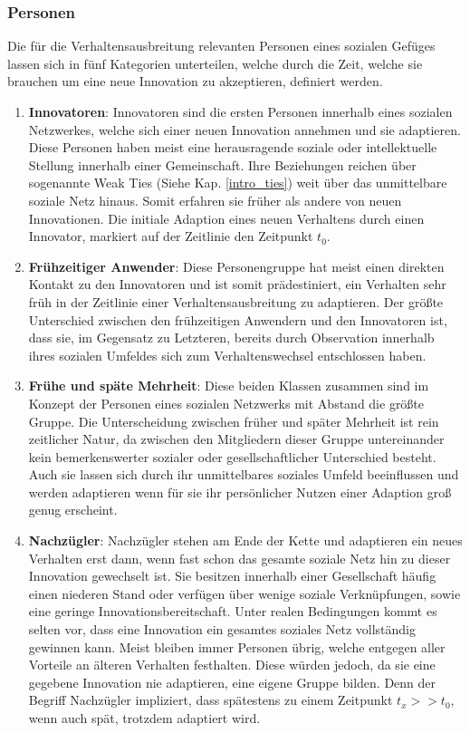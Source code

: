 \documentclass[12pt]{article}
\begin{document}
\subsubsection{Personen}
Die für die Verhaltensausbreitung relevanten Personen eines sozialen Gefüges lassen sich in fünf Kategorien unterteilen, welche durch die Zeit, welche sie brauchen um eine neue Innovation zu akzeptieren, definiert werden. \cite{Rogers03}
\begin{enumerate}
\item \textbf{Innovatoren}: Innovatoren sind die ersten Personen innerhalb eines sozialen Netzwerkes, welche sich einer neuen Innovation annehmen und sie adaptieren. Diese Personen haben meist eine herausragende soziale oder intellektuelle Stellung innerhalb einer Gemeinschaft. Ihre Beziehungen reichen über sogenannte Weak Ties (Siehe Kap. \ref{intro_ties}) weit über das unmittelbare soziale Netz hinaus. Somit erfahren sie früher als andere von neuen Innovationen. Die initiale Adaption eines neuen Verhaltens durch einen Innovator, markiert auf der Zeitlinie den Zeitpunkt $t_0$.
\item \textbf{Frühzeitiger Anwender}: Diese Personengruppe hat meist einen direkten Kontakt zu den Innovatoren und ist somit prädestiniert, ein Verhalten sehr früh in der Zeitlinie einer Verhaltensausbreitung zu adaptieren. Der größte Unterschied zwischen den frühzeitigen Anwendern und den Innovatoren ist, dass sie, im Gegensatz zu Letzteren, bereits durch Observation innerhalb ihres sozialen Umfeldes sich zum Verhaltenswechsel entschlossen haben.
\item \textbf{Frühe und späte Mehrheit}: Diese beiden Klassen zusammen sind im Konzept der Personen eines sozialen Netzwerks mit Abstand die größte Gruppe. Die Unterscheidung zwischen früher und später Mehrheit ist rein zeitlicher Natur, da zwischen den Mitgliedern dieser Gruppe untereinander kein bemerkenswerter sozialer oder gesellschaftlicher Unterschied besteht. Auch sie lassen sich durch ihr unmittelbares soziales Umfeld beeinflussen und werden adaptieren wenn für sie ihr persönlicher Nutzen einer Adaption groß genug erscheint.
\item \textbf{Nachzügler}: Nachzügler stehen am Ende der Kette und adaptieren ein neues Verhalten erst dann, wenn fast schon das gesamte soziale Netz hin zu dieser Innovation gewechselt ist. Sie besitzen innerhalb einer Gesellschaft häufig einen niederen Stand oder verfügen über wenige soziale Verknüpfungen, sowie eine geringe Innovationsbereitschaft. Unter realen Bedingungen kommt es selten vor, dass eine Innovation ein gesamtes soziales Netz vollständig gewinnen kann. Meist bleiben immer Personen übrig, welche entgegen aller Vorteile an älteren Verhalten festhalten. Diese würden jedoch, da sie eine gegebene Innovation nie adaptieren, eine eigene Gruppe bilden. Denn der Begriff Nachzügler impliziert, dass spätestens zu einem Zeitpunkt $t_x >> t_0$, wenn auch spät, trotzdem adaptiert wird.
\end{enumerate}
\end{document}

